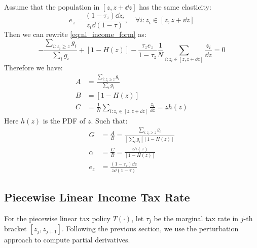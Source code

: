 Assume that the population in $[z,z+\dd z]$ has the same elasticity:
\begin{equation*}
    e_z = \frac{(1-\tau_z)\dd z_i}{z_i\dd(1-\tau)}, \quad \forall i: z_i \in [z,z+\dd z]
\end{equation*}
Then we can rewrite \eqref{eq:nl_income_form} as:
\begin{equation*} 
    -\frac{\sum_{i:z_i\geq z} g_i}{\sum_i g_i}  + [1-H(z)] - \frac{\tau_z e_z}{1-\tau_z}\frac{1}{N}\sum_{i:z_i \in [z,z+\dd z]} \frac{z_i}{\dd z} = 0
\end{equation*}
Therefore we have:
\begin{align*}
    A &= \frac{\sum_{i:z_i\geq z} g_i}{\sum_i g_i} \\
    B &= [1-H(z)] \\
    C &= \frac{1}{N}\sum_{i:z_i \in [z,z+\dd z]} \frac{z_i}{\dd z} = zh(z)
\end{align*}
Here $h(z)$ is the PDF of $z$.
Such that:
\begin{align*}
    G &= \frac{A}{B} = \frac{\sum_{i:z_i\geq z} g_i}{\left [\sum_i g_i\right ][1-H(z)]} \\
    \alpha &= \frac{C}{B} = \frac{zh(z)}{[1-H(z)]} \\
    e_z &= \frac{(1-\tau_z)\dd z}{z\dd(1-\tau)}
\end{align*}


\subsection{Piecewise Linear Income Tax Rate}
For the piecewise linear tax policy $T(\cdot)$, let $\tau_j$ be the marginal tax rate in $j$-th bracket $[z_j,z_{j+1}]$. Following the previous section, we use the perturbation approach to compute partial derivatives. 

